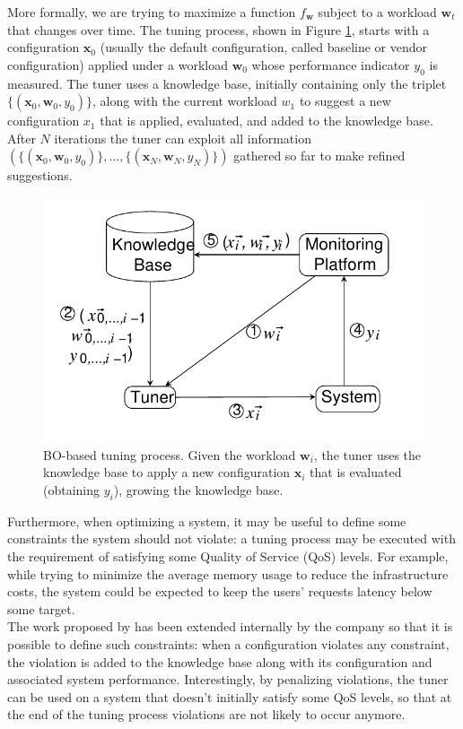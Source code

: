 \documentclass[a4paper, 12pt]{article} %
\begin{document}
	More formally, we are trying to maximize a function $f_{\pmb{w}}$ subject to a workload $\pmb{w}_t$ that changes over time. The tuning process, shown in Figure \ref{fig:cgp_it_sys}, starts with a configuration $\pmb{x}_0$ (usually the default configuration, called baseline or vendor configuration) applied under a workload $\pmb{w}_0$ whose performance indicator $y_0$ is measured. The tuner uses a knowledge base, initially containing only the triplet $\{(\pmb{x}_0, \pmb{w}_0, y_0)\}$, along with the current workload $w_1$ to suggest a new configuration $x_1$ that is applied, evaluated, and added to the knowledge base. After $N$ iterations the tuner can exploit all information $(\{(\pmb{x}_0, \pmb{w}_0, y_0)\}, ..., \{(\pmb{x}_N, \pmb{w}_N, y_N)\})$ gathered so far to make refined suggestions.
	\begin{figure} \centering
		\includegraphics[width = 5in]{img/cgp_it_sys.png}
		\caption{BO-based tuning process. Given the workload $\pmb{w}_i$, the tuner uses the knowledge base to apply a new configuration $\pmb{x}_i$ that is evaluated (obtaining $y_i$), growing the knowledge base.}
		\label{fig:cgp_it_sys}
	\end{figure}
	
	Furthermore, when optimizing a system, it may be useful to define some constraints the system should not violate: a tuning process may be executed with the requirement of satisfying some Quality of Service (QoS) levels. For example, while trying to minimize the average memory usage to reduce the infrastructure costs, the system could be expected to keep the users' requests latency below some target.  \\
	The work proposed by \cite{AkamasCGP} has been extended internally by the company so that it is possible to define such constraints: when a configuration violates any constraint, the violation is added to the knowledge base along with its configuration and associated system performance. Interestingly, by penalizing violations, the tuner can be used on a system that doesn't initially satisfy some QoS levels, so that at the end of the tuning process violations are not likely to occur anymore.
	
\end{document}
